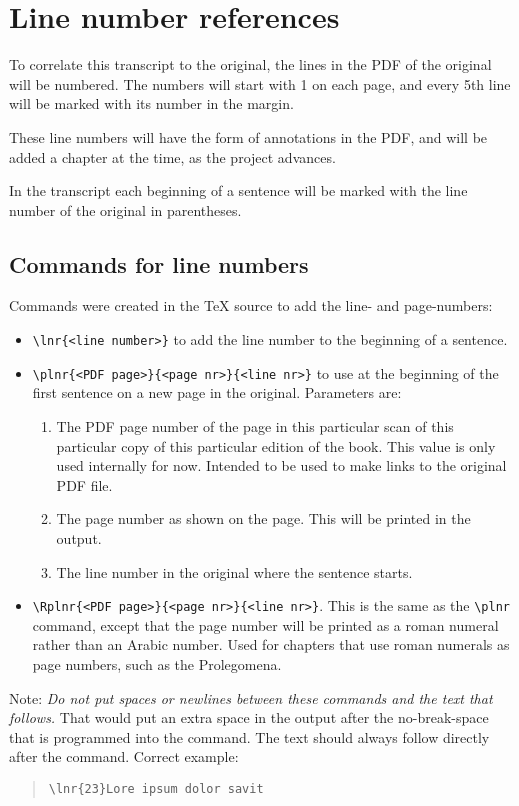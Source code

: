 \documentclass{report}
\begin{document}
\section{Line number references}
To correlate this transcript to the original,  the lines
in the PDF of the original will be numbered.
The numbers will start with 1 on each page, and every 5th line will be marked
with its number in the margin.

These line numbers will have the form of annotations in the PDF, and will
be added a chapter at the time, as the project advances.

In the transcript each beginning of a sentence will be marked with
the line number of the original
in parentheses.

\subsection{Commands for line numbers}
Commands were created in the TeX source to add the line- and page-numbers:
\begin{itemize}
\item \verb+\lnr{<line number>}+ to add the line number to the beginning of
a sentence.
\item \verb+\plnr{<PDF page>}{<page nr>}{<line nr>}+ to use at the beginning of the first sentence on a new page in the original. Parameters are:
\begin{enumerate}
\item The PDF page number of the page in this particular scan of this particular
copy of this particular edition of the book.
This value is only used internally for now. Intended to be used to
make links to the original PDF file.
\item The page number as shown on the page. This will be printed in the output.
\item The line number in the original where the sentence starts.
\end{enumerate}
\item \verb+\Rplnr{<PDF page>}{<page nr>}{<line nr>}+. This is the same as the
 \verb+\plnr+ command, except that the page number will be printed as a roman
 numeral rather than an Arabic number. Used for chapters that use roman numerals
 as page numbers, such as the Prolegomena.
\end{itemize}

Note: \emph{Do not put spaces or newlines between these commands and the
text that follows.} That would put an extra space in the output after the no-break-space that is programmed into the command. The text should always follow
directly after the command. Correct example:\begin{quote}
\verb+\lnr{23}Lore ipsum dolor savit+
\end{quote}
\end{document}
